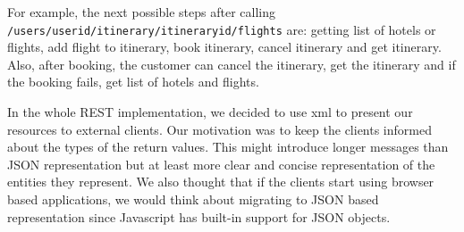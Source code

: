 For example, the next possible steps after calling\\ \texttt{/users/{userid}/itinerary/{itineraryid}/flights} are: getting list of hotels or flights, add flight to itinerary, book itinerary, cancel itinerary and get itinerary. Also, after booking, the customer can cancel the itinerary, get the itinerary and if the booking fails, get list of hotels and flights.

In the whole REST implementation, we decided to use xml to present our resources to external clients. Our motivation was to keep the clients informed about the types of the return values. This might introduce longer messages than JSON representation but at least more clear and concise representation of the entities they represent. We also thought that if the clients start using browser based applications, we would think about migrating to JSON based representation since Javascript has built-in support for JSON objects.

